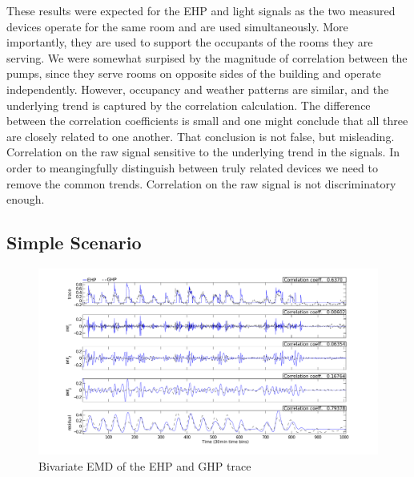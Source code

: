 These results were expected for the EHP and light signals as the two measured devices operate for the same room 
and are used simultaneously.  More importantly, they are used to support the occupants of the rooms they are serving.
We were somewhat surpised by the magnitude of correlation between the pumps, since they serve rooms on
opposite sides of the building and operate independently.  However, occupancy and weather patterns are similar,
and the underlying trend is captured by the correlation calculation.
The difference between the correlation coefficients is small and one might conclude that all three are
closely related to one another.  That conclusion is not false, but misleading.  Correlation on the raw 
signal sensitive to the underlying trend in the signals.  In order to meangingfully distinguish between
truly related devices we need to remove the common trends.  Correlation on the raw signal is not
discriminatory enough.


\subsection{Simple Scenario}

\begin{figure}[tb]
\hspace{-2cm}
\includegraphics[width=1.2\textwidth]{img/emd_25_41-eps-converted-to}
\vspace{-1cm}
\caption{Bivariate EMD of the EHP and GHP trace}
\label{fig:emd2}
\end{figure}

